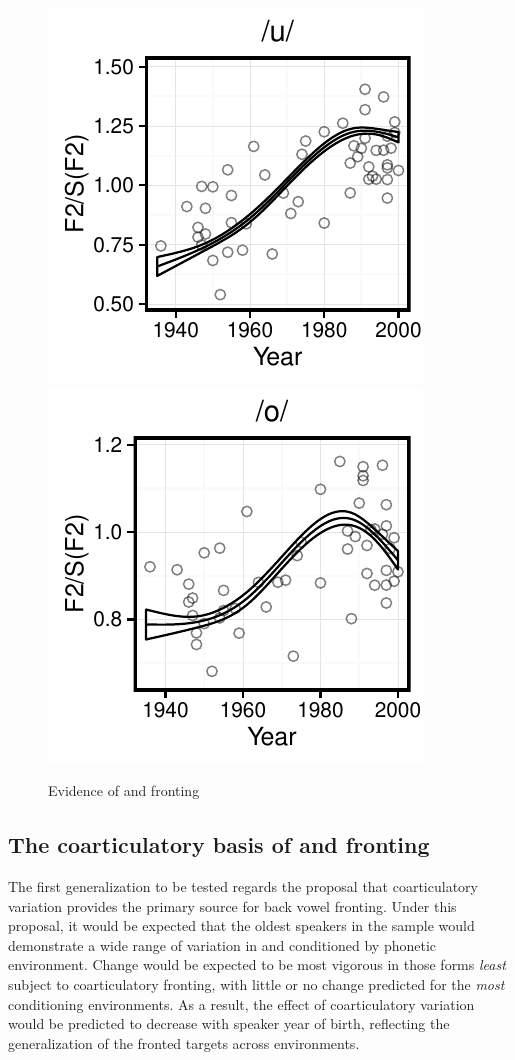 \documentclass[12pt]{article}
\begin{document}
\vspace*{6pt}
\begin{figure}[H]
\centering
\includegraphics{uwchange}
\includegraphics{owchange}
\caption{Evidence of  and  fronting}
\end{figure}
\vspace*{6pt}

\subsection{The coarticulatory basis of  and  fronting}

The first generalization to be tested regards the proposal that coarticulatory variation provides the primary source for back vowel fronting. Under this proposal, it would be expected that the oldest speakers in the sample would demonstrate a wide range of variation in  and  conditioned by phonetic environment. Change would be expected to be most vigorous in those forms \textit{least} subject to coarticulatory fronting, with little or no change predicted for the \textit{most} conditioning environments. As a result, the effect of coarticulatory variation would be predicted to decrease with speaker year of birth, reflecting the generalization of the fronted targets across environments. 
\end{document}

